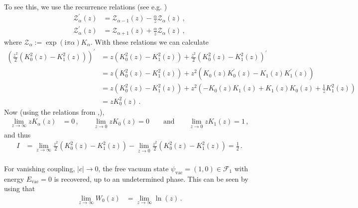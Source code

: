 To see this, we use the recurrence relations (see e.g. \cite{35763ba8})
\begin{align*}
  \mathcal{Z}_{\alpha}^{\prime}(z)
  &=
  \mathcal{Z}_{\alpha - 1}(z)
  -
  \frac{\alpha}{z}
  \mathcal{Z}_{\alpha}(z)
  \,,
  \\
  \mathcal{Z}_{\alpha}^{\prime}(z)
  &=
  \mathcal{Z}_{\alpha + 1}(z)
  +
  \frac{\alpha}{z}
  \mathcal{Z}_{\alpha}(z)
  \,,
\end{align*}
where $\mathcal{Z}_{\alpha} := \exp(\mathrm{i}\pi\alpha)K_{\alpha}$. With these relations we can calculate
\begin{align*}
  \left(
    \frac{z^{2}}{2}
    \left(
      K_{0}^{2}(z)
      -
      K_{1}^{2}(z)
    \right)
  \right)^{\prime}
  &=
  z
  \left(
    K_{0}^{2}(z)
    -
    K_{1}^{2}(z)
  \right)
  +
  \frac{z^{2}}{2}
  \left(
    K_{0}^{2}(z)
    -
    K_{1}^{2}(z)
  \right)^{\prime}
  \\
  &=
  z
  \left(
    K_{0}^{2}(z)
    -
    K_{1}^{2}(z)
  \right)
  +
  z^{2}
  \left(
    K_{0}(z)
    K_{0}^{\prime}(z)
    -
    K_{1}(z)
    K_{1}^{\prime}(z)
  \right)
  \\
  &=
  z
  \left(
    K_{0}^{2}(z)
    -
    K_{1}^{2}(z)
  \right)
  +
  z^{2}
  \left(
    -
    K_{0}(z)
    K_{1}(z)
    +
    K_{1}(z)
    K_{0}(z)
    +
    \frac{1}{z}
    K_{1}^{2}(z)
  \right)
  \\
  &=
  z
  K_{0}^{2}(z)
  \,.
\end{align*}
Now (using the relations from \cite{ca427945},\cite{69346099}),
\begin{align*}
  \lim_{z \to \infty}
  z
  K_{\alpha}(z)
  &=
  0
  \,,
  \qquad
  \lim_{z \to 0}
  z
  K_{0}(z)
  =
  0
  \qquad
  \text{and}
  \qquad
  \lim_{z \to 0}
  z
  K_{1}(z)
  =
  1
  \,,
\end{align*}
and thus
\begin{align*}
  I
  &=
  \lim_{z \to \infty}
  \frac{z^{2}}{2}
  \left(
    K_{0}^{2}(z)
    -
    K_{1}^{2}(z)
  \right)
  -
  \lim_{z \to 0}
  \frac{z^{2}}{2}
  \left(
    K_{0}^{2}(z)
    -
    K_{1}^{2}(z)
  \right)
  =
  \frac{1}{2}
  \,.
\end{align*}
\\
For vanishing coupling, $\vert c \vert \to 0$, the free vacuum state $\psi_{\textrm{vac}} = (1,0) \in \mathcal{F}_{1}$ with energy $E_{\textrm{vac}} = 0$ is recovered, up to an undetermined phase. This can be seen by using that
\begin{align*}
  \lim_{z \to \infty}
  W_{0}(z)
  &=
  \lim_{z \to \infty}
  \ln(z)
  \,.
\end{align*}
